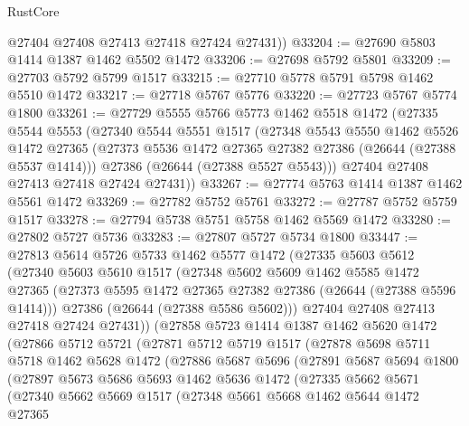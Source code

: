 \begin{lexlean}{RustCore}
\begin{coremodule}
        @27404
        @27408
        @27413
        @27418
        @27424
        @27431))
@33204 := @27690 @5803 @1414 @1387 @1462 @5502 @1472
@33206 := @27698 @5792 @5801
@33209 := @27703 @5792 @5799 @1517
@33215 := @27710 @5778 @5791 @5798 @1462 @5510 @1472
@33217 := @27718 @5767 @5776
@33220 := @27723 @5767 @5774 @1800
@33261 := @27729
    @5555
    @5766
    @5773
    @1462
    @5518
    @1472
    (@27335
      @5544
      @5553
      (@27340
        @5544
        @5551
        @1517
        (@27348
          @5543
          @5550
          @1462
          @5526
          @1472
          @27365
          (@27373 @5536 @1472 @27365 @27382 @27386 (@26644 (@27388 @5537 @1414)))
          @27386
          (@26644 (@27388 @5527 @5543)))
        @27404
        @27408
        @27413
        @27418
        @27424
        @27431))
@33267 := @27774 @5763 @1414 @1387 @1462 @5561 @1472
@33269 := @27782 @5752 @5761
@33272 := @27787 @5752 @5759 @1517
@33278 := @27794 @5738 @5751 @5758 @1462 @5569 @1472
@33280 := @27802 @5727 @5736
@33283 := @27807 @5727 @5734 @1800
@33447 := @27813
    @5614
    @5726
    @5733
    @1462
    @5577
    @1472
    (@27335
      @5603
      @5612
      (@27340
        @5603
        @5610
        @1517
        (@27348
          @5602
          @5609
          @1462
          @5585
          @1472
          @27365
          (@27373 @5595 @1472 @27365 @27382 @27386 (@26644 (@27388 @5596 @1414)))
          @27386
          (@26644 (@27388 @5586 @5602)))
        @27404
        @27408
        @27413
        @27418
        @27424
        @27431))
    (@27858
      @5723
      @1414
      @1387
      @1462
      @5620
      @1472
      (@27866
        @5712
        @5721
        (@27871
          @5712
          @5719
          @1517
          (@27878
            @5698
            @5711
            @5718
            @1462
            @5628
            @1472
            (@27886
              @5687
              @5696
              (@27891
                @5687
                @5694
                @1800
                (@27897
                  @5673
                  @5686
                  @5693
                  @1462
                  @5636
                  @1472
                  (@27335
                    @5662
                    @5671
                    (@27340
                      @5662
                      @5669
                      @1517
                      (@27348
                        @5661
                        @5668
                        @1462
                        @5644
                        @1472
                        @27365

\end{coremodule}
\end{lexlean}

